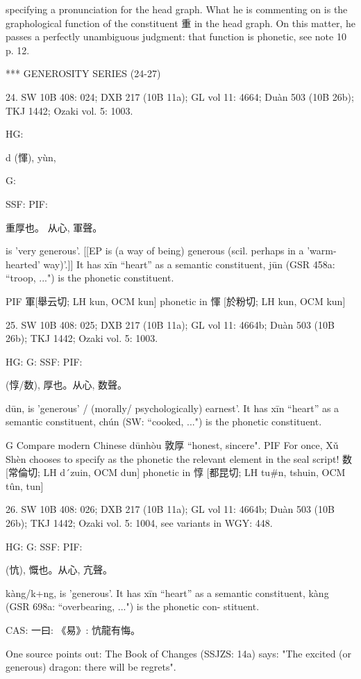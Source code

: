 specifying a pronunciation for the head graph. What he is commenting on is the graphological function of the constituent 重 in the head graph. On this matter, he passes a perfectly unambiguous judgment: that function is phonetic, see note 10 p. 12.

            *** GENEROSITY SERIES (24-27)

24. SW 10B 408: 024; DXB 217 (10B 11a); GL vol 11: 4664; Duàn 503 (10B 26b); TKJ 1442; Ozaki vol. 5: 1003.



HG:

d (惲), yùn,

G:

SSF: PIF:

重厚也。
从心, 軍聲。

is 'very generous'. [[EP is (a way of being) generous (scil. perhaps in a 'warm-hearted' way)'.]]
It has xīn ``heart'' as a semantic constituent,
jūn (GSR 458a: ``troop, ...") is the phonetic constituent.

PIF     軍[舉云切; LH kun, OCM kun] phonetic in 惲 [於粉切; LH kun, OCM kun]

25. SW 10B 408: 025; DXB 217 (10B 11a); GL vol 11: 4664b; Duàn 503 (10B 26b); TKJ 1442; Ozaki vol. 5: 1003.



HG:
G: SSF: PIF:

  (惇/数),
厚也。从心, 数聲。

dūn,
is 'generous' / (morally/ psychologically) earnest'. It has xīn ``heart'' as a semantic constituent,
chún (SW: ``cooked, ...") is the phonetic constituent.

G	Compare modern Chinese dūnhòu 敦厚 ``honest, sincere".
PIF   For once, Xǔ Shèn chooses to specify as the phonetic the relevant element in the seal script!
数[常倫切; LH d´zuin, OCM dun] phonetic in 惇 [都昆切; LH tu\#n, tshuin, OCM tûn, tun]

26. SW 10B 408: 026; DXB 217 (10B 11a); GL vol 11: 4664b; Duàn 503 (10B 26b); TKJ 1442; Ozaki vol. 5: 1004, see
variants in WGY: 448.


HG:
G: SSF: PIF:

 (忼),
慨也。从心, 亢聲。


kàng/k+ng, is 'generous'.
It has xīn ``heart'' as a semantic constituent,
kàng (GSR 698a: ``overbearing, ...") is the phonetic con- stituent.




CAS: 一曰:
《易》:
忼龍有悔。

One source points out:
The Book of Changes (SSJZS: 14a) says:
"The excited (or generous) dragon: there will be regrets".

